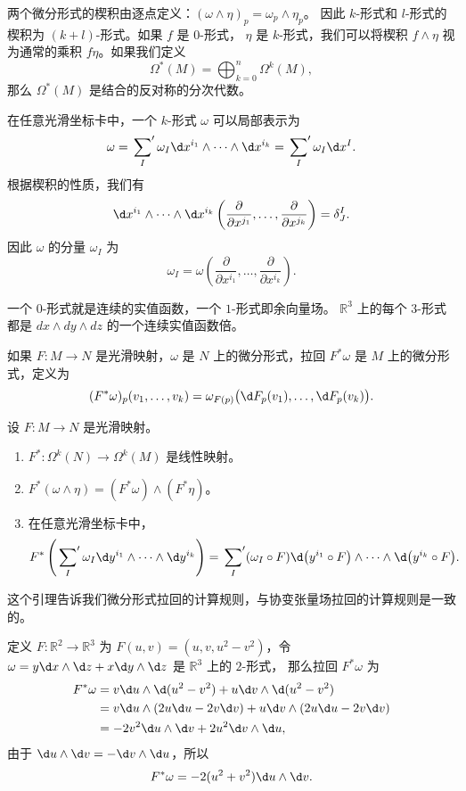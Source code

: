 两个微分形式的楔积由逐点定义：$(\omega\wedge\eta)_p=\omega_p\wedge\eta_p$。
因此 $k$-形式和 $l$-形式的楔积为 $(k+l)$-形式。如果 $f$ 是 $0$-形式，
$\eta$ 是 $k$-形式，我们可以将楔积 $f\wedge \eta$ 视为通常的乘积
$f\eta$。如果我们定义
\begin{equation}
  \Omega^*(M)=\bigoplus_{k=0}^n\Omega^k(M),
\end{equation}
那么 $\Omega^*(M)$ 是结合的反对称的分次代数。

在任意光滑坐标卡中，一个 $k$-形式 $\omega$ 可以局部表示为
\[
  \omega=\sideset{}{'}\sum_I\omega_I\d x^{i_1}\wedge
  \cdots\wedge \d x^{i_k}=\sideset{}{'}\sum_I\omega_I \d x^I.
\]
根据楔积的性质，我们有
\[
  \d x^{i_1}\wedge
  \cdots\wedge \d x^{i_k}
  \left(\frac{\partial}{\partial x^{j_1}},\dots,\frac{\partial}{\partial x^{j_k}}\right)
  =\delta_J^I.
\]
因此 $\omega$ 的分量 $\omega_I$ 为
\[
  \omega_I=\omega\left(\frac{\partial}{\partial x^{i_1}},\dots,\frac{\partial}{\partial x^{i_k}}\right)  .
\]

\begin{example}
  一个 $0$-形式就是连续的实值函数，一个 $1$-形式即余向量场。
  $\mathbb{R}^3$ 上的每个 $3$-形式都是 $dx\wedge dy\wedge dz$ 的一个连续实值函数倍。
\end{example}

如果 $F:M\to N$ 是光滑映射，$\omega$ 是 $N$ 上的微分形式，拉回
$F^*\omega$ 是 $M$ 上的微分形式，定义为
\[
  (F^*\omega)_p(v_1,\dots,v_k)=\omega_{F(p)}\bigl(\d F_p(v_1),\dots,\d F_p(v_k)\bigr)  .
\]

\begin{lemma}\label{lemma:pullback of form}
  设 $F:M\to N$ 是光滑映射。
  \begin{enumerate}
    \item $F^*:\Omega^k(N)\to \Omega^k(M)$ 是线性映射。
    \item $F^*(\omega\wedge\eta)=(F^*\omega)\wedge(F^*\eta)$。
    \item 在任意光滑坐标卡中，
    \[
      F^*\left(\sideset{}{'}\sum_I\omega_I\d y^{i_1}\wedge\cdots\wedge\d y^{i_k}\right)  
      =\sideset{}{'}\sum_I(\omega_I\circ F)\d\bigl(y^{i_1}\circ F\bigr)\wedge
      \cdots\wedge \d \bigl(y^{i_k}\circ F\bigr).
    \]
  \end{enumerate}
\end{lemma}

这个引理告诉我们微分形式拉回的计算规则，与协变张量场拉回的计算规则是一致的。

\begin{example}
  定义 $F:\mathbb{R}^2\to \mathbb{R}^3$ 为 $F(u,v)=(u,v,u^2-v^2)$，令
  $\omega=y\d x\wedge\d z+x\d y\wedge\d z$ 是 $\mathbb{R}^3$ 上的 $2$-形式，
  那么拉回 $F^*\omega$ 为
  \begin{align*}
    F^*\omega&=v\d u\wedge\d (u^2-v^2)+u\d v\wedge\d (u^2-v^2)\\
    &=v\d u\wedge(2u\d u-2v\d v)+u\d v\wedge(2u\d u-2v\d v)\\
    &=-2v^2\d u\wedge\d v+2u^2\d v\wedge\d u,
  \end{align*}
  由于 $\d u\wedge\d v=-\d v\wedge \d u$，所以
  \[
    F^*\omega=-2(u^2+v^2)\d u\wedge\d v.  
  \]
\end{example}

